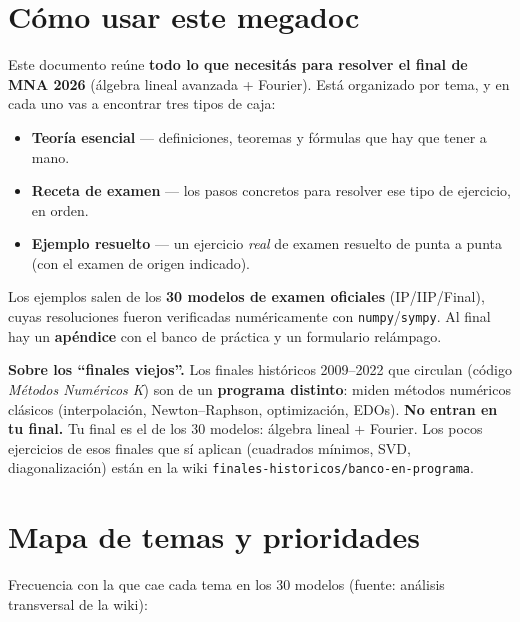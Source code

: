 \section*{Cómo usar este megadoc}

Este documento reúne \textbf{todo lo que necesitás para resolver el final de MNA 2026} (álgebra lineal avanzada + Fourier). Está organizado por tema, y en cada uno vas a encontrar tres tipos de caja:

\begin{itemize}
\item \colorbox{cazul!12}{\textbf{Teoría esencial}} — definiciones, teoremas y fórmulas que hay que tener a mano.
\item \colorbox{cverde!14}{\textbf{Receta de examen}} — los pasos concretos para resolver ese tipo de ejercicio, en orden.
\item \colorbox{cnaranja!16}{\textbf{Ejemplo resuelto}} — un ejercicio \emph{real} de examen resuelto de punta a punta (con el examen de origen indicado).
\end{itemize}

\noindent Los ejemplos salen de los \textbf{30 modelos de examen oficiales} (IP/IIP/Final), cuyas resoluciones fueron verificadas numéricamente con \texttt{numpy}/\texttt{sympy}. Al final hay un \textbf{apéndice} con el banco de práctica y un formulario relámpago.

\begin{truco}
\textbf{Sobre los ``finales viejos''.} Los finales históricos 2009--2022 que circulan (código \emph{Métodos Numéricos K}) son de un \textbf{programa distinto}: miden métodos numéricos clásicos (interpolación, Newton--Raphson, optimización, EDOs). \textbf{No entran en tu final.} Tu final es el de los 30 modelos: álgebra lineal + Fourier. Los pocos ejercicios de esos finales que sí aplican (cuadrados mínimos, SVD, diagonalización) están en la wiki \texttt{finales-historicos/banco-en-programa}.
\end{truco}

\section*{Mapa de temas y prioridades}

Frecuencia con la que cae cada tema en los 30 modelos (fuente: análisis transversal de la wiki):

